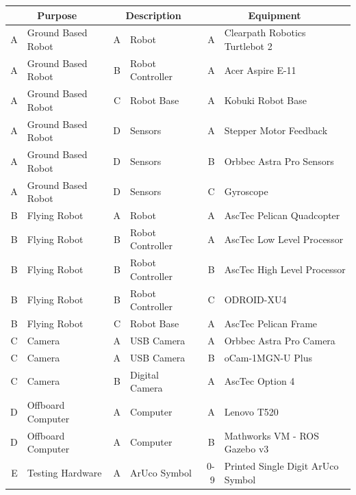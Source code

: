 \documentclass{article}
\begin{document}
	\begin{table}
		\small
		\begin{tabular}{|rl|rl|rl|}
			\hline
			\multicolumn{2}{|c|}{\textbf{Purpose}} & \multicolumn{2}{c|}{\textbf{Description}} & \multicolumn{2}{c|}{\textbf{Equipment}} \\ \hline
			A & Ground Based Robot     & A & Robot              & A   & Clearpath Robotics Turtlebot 2    \\
			A & Ground Based Robot     & B & Robot Controller   & A   & Acer Aspire E-11                  \\
			A & Ground Based Robot     & C & Robot Base         & A   & Kobuki Robot Base                 \\
			A & Ground Based Robot     & D & Sensors            & A   & Stepper Motor Feedback            \\
			A & Ground Based Robot     & D & Sensors            & B   & Orbbec Astra Pro Sensors          \\
			A & Ground Based Robot     & D & Sensors            & C   & Gyroscope                         \\ \hline
			B & Flying Robot           & A & Robot              & A   & AscTec Pelican Quadcopter         \\
			B & Flying Robot           & B & Robot Controller   & A   & AscTec Low Level Processor        \\
			B & Flying Robot           & B & Robot Controller   & B   & AscTec High Level Processor       \\
			B & Flying Robot           & B & Robot Controller   & C   & ODROID-XU4                        \\
			B & Flying Robot           & C & Robot Base         & A   & AscTec Pelican Frame              \\ \hline
			C & Camera                 & A & USB Camera         & A   & Orbbec Astra Pro Camera           \\
			C & Camera                 & A & USB Camera         & B   & oCam-1MGN-U Plus                  \\
			C & Camera                 & B & Digital Camera     & A   & AscTec Option 4                   \\ \hline
			D & Offboard Computer      & A & Computer           & A   & Lenovo T520                       \\
			D & Offboard Computer      & A & Computer           & B   & Mathworks VM - ROS Gazebo v3      \\ \hline
			E & Testing Hardware       & A & ArUco Symbol       & 0-9 & Printed Single Digit ArUco Symbol \\

\end{tabular}
\end{table}
\end{document}
